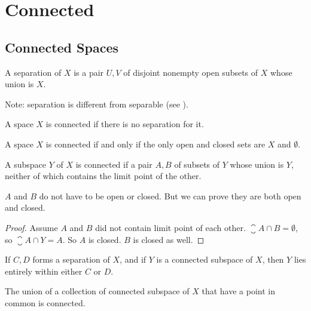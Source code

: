 \chapter{Connected}

\section{Connected Spaces}

\begin{definition}\label{separation}
    A separation of $X$ is a pair $U,V$ of disjoint nonempty open subsets of $X$ whose union is $X$.
    
    
    Note: separation is different from separable (see ).
\end{definition}

\begin{definition}
    A space $X$ is connected if there is no separation for it.
\end{definition}

\begin{theorem}
    A space $X$ is connected if and only if the only open and closed sets are $X$ and $\emptyset$.
\end{theorem}

\begin{theorem}
    A subspace $Y$ of $X$ is connected if a pair $A,B$ of subsets of $Y$ whose union is $Y$, neither of which contains the limit point of the other.
    
    $A$ and $B$ do not have to be open or closed. But we can prove they are both open and closed.
\end{theorem}
\begin{proof}
    Assume $A$ and $B$ did not contain limit point of each other. $\closure{A} \cap B = \emptyset$, so $\closure{A} \cap Y = A$. So $A$ is closed. $B$ is closed as well.
\end{proof}

\begin{theorem}
    If $C,D$ forms a separation of $X$, and if $Y$ is a connected subspace of $X$, then $Y$ lies entirely within either $C$ or $D$.
\end{theorem}

\begin{theorem}
The union of a collection of connected subspace of $X$ that have a point in common is connected.    
\end{theorem}

